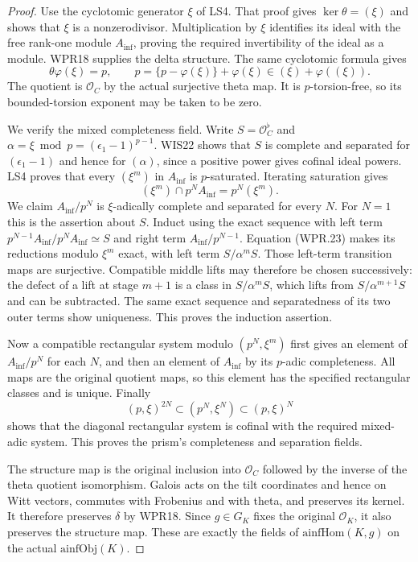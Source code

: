 \documentclass[11pt,a4paper]{article}
\numberwithin{equation}{section}
\theoremstyle{remark}\newtheorem{remark}[theorem]{Remark}
\begin{document}
\begin{proof}
Use the cyclotomic generator $\xi$ of LS4. That proof gives
$\ker\theta=(\xi)$ and shows that $\xi$ is a nonzerodivisor.
Multiplication by $\xi$ identifies its ideal with the free
rank-one module $A_{\mathrm{inf}}$, proving the required invertibility
of the ideal as a module. WPR18 supplies the delta structure.
The same cyclotomic formula gives
\[
 \theta\varphi(\xi)=p,
 \qquad p=\{p-\varphi(\xi)\}+\varphi(\xi)
                  \in(\xi)+\varphi((\xi)).                 \tag{WPR.22}
\]
The quotient is $\mathcal O_C$ by the actual surjective theta
map. It is $p$-torsion-free, so its bounded-torsion exponent may
be taken to be zero.

We verify the mixed completeness field. Write $S=\mathcal O_C^\flat$
and $\alpha=\xi\bmod p=(\epsilon_1-1)^{p-1}$.
WIS22 shows that $S$ is complete and separated for
$(\epsilon_1-1)$ and hence for $(\alpha)$, since a positive
power gives cofinal ideal powers. LS4 proves that every
$(\xi^m)$ in $A_{\mathrm{inf}}$ is $p$-saturated. Iterating saturation
gives
\[
             (\xi^m)\cap p^NA_{\mathrm{inf}}=p^N(\xi^m).             \tag{WPR.23}
\]
We claim $A_{\mathrm{inf}}/p^N$ is $\xi$-adically complete and separated
for every $N$. For $N=1$ this is the assertion about $S$.
Induct using the exact sequence with left term
$p^{N-1}A_{\mathrm{inf}}/p^NA_{\mathrm{inf}}\simeq S$ and right term
$A_{\mathrm{inf}}/p^{N-1}$. Equation (WPR.23) makes its reductions
modulo $\xi^m$ exact, with left term $S/\alpha^mS$.
Those left-term transition maps are surjective. Compatible
middle lifts may therefore be chosen successively: the defect
of a lift at stage $m+1$ is a class in $S/\alpha^mS$, which
lifts from $S/\alpha^{m+1}S$ and can be subtracted. The same
exact sequence and separatedness of its two outer terms show
uniqueness. This proves the induction assertion.

Now a compatible rectangular system modulo $(p^N,\xi^m)$
first gives an element of $A_{\mathrm{inf}}/p^N$ for each $N$, and
then an element of $A_{\mathrm{inf}}$ by its $p$-adic completeness.
All maps are the original quotient maps, so this element has
the specified rectangular classes and is unique. Finally
\[
 (p,\xi)^{2N}\subset(p^N,\xi^N)\subset(p,\xi)^N
\]
shows that the diagonal rectangular system is cofinal with
the required mixed-adic system. This proves the prism's
completeness and separation fields.

The structure map is the original inclusion into $\mathcal O_C$
followed by the inverse of the theta quotient isomorphism.
Galois acts on the tilt coordinates and hence on Witt vectors,
commutes with Frobenius and with theta, and preserves its kernel.
It therefore preserves $\delta$ by WPR18. Since $g\in G_K$
fixes the original $\mathcal O_K$, it also preserves the
structure map. These are exactly the fields of
$\mathrm{ainfHom}(K,g)$ on the actual $\mathrm{ainfObj}(K)$.
\end{proof}
\end{document}

